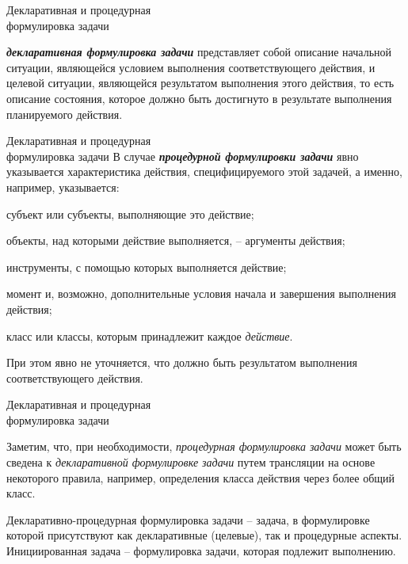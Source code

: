\begin{frame}{Декларативная и процедурная\\ формулировка задачи}
	\topline
	\justifying
  
    \textbf{\textit{декларативная формулировка задачи}} представляет собой описание начальной ситуации, являющейся условием выполнения соответствующего действия, и целевой ситуации, являющейся результатом выполнения этого действия, то есть  описание состояния, которое должно быть достигнуто в результате выполнения планируемого действия. 
\end{frame}

\begin{frame}{Декларативная и процедурная\\ формулировка задачи}
	\topline
	\justifying
     В случае \textbf{\textit{процедурной формулировки задачи}} явно указывается характеристика действия, специфицируемого этой задачей, а именно, например, указывается:
    \begin{textitemize}
    \item субъект или субъекты, выполняющие это действие;
    \item объекты, над которыми действие выполняется, -- аргументы действия;
    \item инструменты, с помощью которых выполняется действие;
    \item момент и, возможно, дополнительные условия начала и завершения выполнения действия;
    \item класс или классы, которым принадлежит каждое \textit{действие}.
    \end{textitemize}	
    
	При этом явно не уточняется, что должно быть результатом выполнения соответствующего действия. 
    
\end{frame}

\begin{frame}{Декларативная и процедурная\\ формулировка задачи}
	\topline
	\justifying
	\vspace{10mm}
	
    Заметим, что, при необходимости, \textit{процедурная формулировка задачи} может быть сведена к \textit{декларативной формулировке задачи} путем трансляции на основе некоторого правила, например, определения класса действия через более общий класс.
    
    \bigskip
    
    Декларативно-процедурная формулировка задачи -- задача, в формулировке которой присутствуют как декларативные (целевые), так и процедурные аспекты.  Инициированная задача -- формулировка задачи, которая подлежит выполнению.
    
\end{frame}

